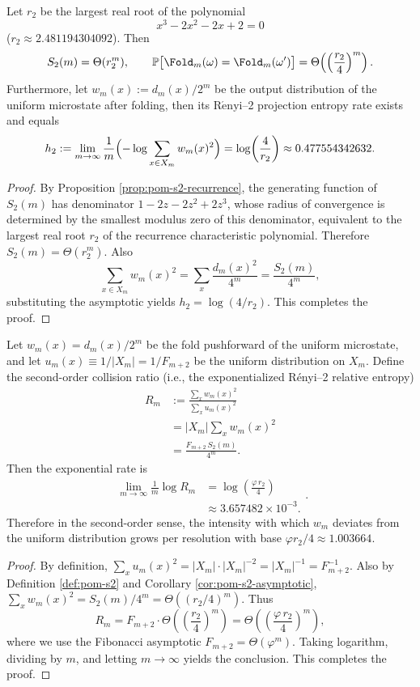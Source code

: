 \begin{corollary}\label{cor:pom-s2-asymptotic}
Let \(r_2\) be the largest real root of the polynomial
$$
x^3-2x^2-2x+2=0
$$
(\(r_2\approx 2.481194304092\)). Then
$$
S_2(m)=\Theta(r_2^m),
\qquad
\mathbb{P}\bigl[\Fold_m(\omega)=\Fold_m(\omega')\bigr]
=\Theta\!\left(\left(\frac{r_2}{4}\right)^m\right).
$$
Furthermore, let \(w_m(x):=d_m(x)/2^m\) be the output distribution of the uniform microstate after folding, then its \(\mathrm{R\acute{e}nyi}\)--2 projection entropy rate exists and equals
$$
h_2:=\lim_{m\to\infty}\frac{1}{m}\Bigl(-\log\sum_{x\in X_m}w_m(x)^2\Bigr)
=\log\!\left(\frac{4}{r_2}\right)\approx 0.477554342632.
$$
\end{corollary}
\begin{proof}
By Proposition \ref{prop:pom-s2-recurrence}, the generating function of \(S_2(m)\) has denominator \(1-2z-2z^2+2z^3\), whose radius of convergence is determined by the smallest modulus zero of this denominator, equivalent to the largest real root \(r_2\) of the recurrence characteristic polynomial. Therefore \(S_2(m)=\Theta(r_2^m)\). Also
$$
\sum_{x\in X_m}w_m(x)^2=\sum_x \frac{d_m(x)^2}{4^m}=\frac{S_2(m)}{4^m},
$$
substituting the asymptotic yields \(h_2=\log(4/r_2)\). This completes the proof.
\end{proof}

\begin{corollary}\label{cor:pom-renyi2-near-uniform}
Let \(w_m(x)=d_m(x)/2^m\) be the fold pushforward of the uniform microstate, and let \(u_m(x)\equiv 1/|X_m|=1/F_{m+2}\) be the uniform distribution on \(X_m\). Define the second-order collision ratio (i.e., the exponentialized Rényi--2 relative entropy)
\[
\begin{aligned}
R_m
&:=\frac{\sum_x w_m(x)^2}{\sum_x u_m(x)^2}\\
&=|X_m|\sum_x w_m(x)^2\\
&=\frac{F_{m+2}\,S_2(m)}{4^m}.
\end{aligned}
\]
Then the exponential rate is
\[
\boxed{
\begin{aligned}
\lim_{m\to\infty}\frac{1}{m}\log R_m
&=\log\!\left(\frac{\varphi\,r_2}{4}\right)\\
&\approx 3.657482\times 10^{-3}.
\end{aligned}
}.
\]
Therefore in the second-order sense, the intensity with which \(w_m\) deviates from the uniform distribution grows per resolution with base \(\varphi r_2/4\approx 1.003664\).
\end{corollary}
\begin{proof}
By definition,
\(
\sum_x u_m(x)^2=|X_m|\cdot |X_m|^{-2}=|X_m|^{-1}=F_{m+2}^{-1}
\).
Also by Definition \ref{def:pom-s2} and Corollary \ref{cor:pom-s2-asymptotic},
\(
\sum_x w_m(x)^2=S_2(m)/4^m=\Theta((r_2/4)^m)
\).
Thus
\[
R_m=F_{m+2}\cdot \Theta\!\left(\left(\frac{r_2}{4}\right)^m\right)
=\Theta\!\left(\left(\frac{\varphi\,r_2}{4}\right)^m\right),
\]
where we use the Fibonacci asymptotic \(F_{m+2}=\Theta(\varphi^m)\). Taking logarithm, dividing by \(m\), and letting \(m\to\infty\) yields the conclusion. This completes the proof.
\end{proof}

